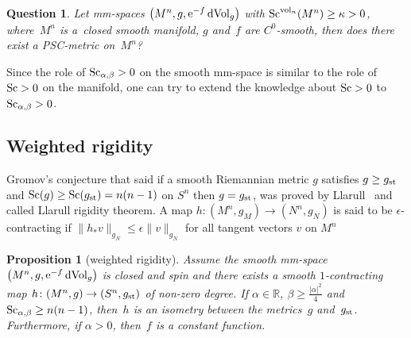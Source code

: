 \documentclass[10pt,a4paper]{amsart}
\newtheorem{Question}[Theorem]{Question}
\newtheorem{Proposition}[Theorem]{Proposition}
\begin{document}
\begin{Question}Let mm-spaces $\big(M^n,g, {\rm e}^{-f}\,{\rm dVol}_{g}\big)$ with ${\rm Sc}^{{\rm vol}_n}(M^n)\geq \kappa>0$, where~$M^n$ is a~closed smooth manifold, $g$ and~$f$ are $C^0$-smooth, then does there exist a PSC-metric on~$M^n$?
\end{Question}

Since the role of ${\rm Sc}_{\alpha, \beta}>0$ on the smooth mm-space is similar to the role of ${\rm Sc}>0$ on the manifold, one can try to extend the knowledge about ${\rm Sc}>0$ to ${\rm Sc}_{\alpha, \beta}>0$.

\subsection{Weighted rigidity}
Gromov's conjecture that said if a smooth Riemannian metric $g$ satisfies $g\geq g_{\rm st}$ and ${\rm Sc}(g)\geq {\rm Sc}(g_{\rm st})=n(n-1)$ on $S^n$ then $g=g_{\rm st}$, was proved by Llarull~\cite{MR1600027} and called Llarull rigidity theorem. A map $h\colon (M^n, g_M)\to (N^n, g_N)$ is said to be $\epsilon$-contracting if $\|h_*v\|_{g_N}\leq \epsilon\|v\|_{g_N}$ for all tangent vectors $v$ on $M^n$

\begin{Proposition}[weighted rigidity] Assume the smooth mm-space $\big(M^n,g, {\rm e}^{-f}\,{\rm dVol}_{g}\big)$ is closed and spin and there exists a smooth $1$-contracting map $h\colon (M^n, g)\to (S^n, g_{\rm st})$ of non-zero degree. If $\alpha \in \mathbb{R}$, $\beta \geq \frac{|\alpha|^2}{4}$ and ${\rm Sc}_{\alpha, \beta}\geq n(n-1)$, then~$h$ is an isometry between the metrics~$g$ and~$g_{\rm st}$. Furthermore, if $\alpha> 0$, then~$f$ is a constant function.
\end{Proposition}
\end{document}
